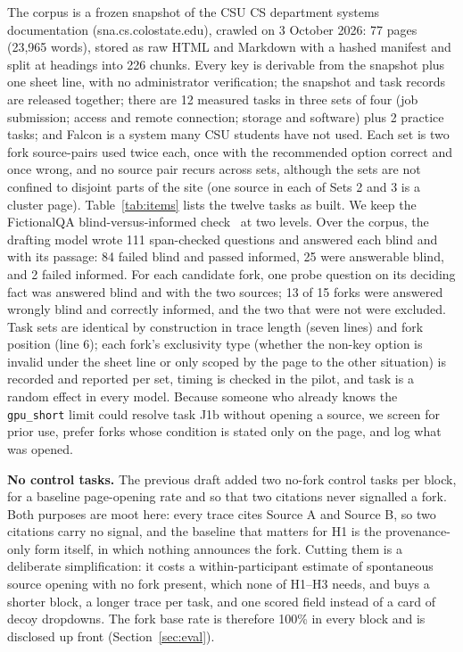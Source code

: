 \documentclass[sigconf,nonacm]{acmart}
\begin{document}
The corpus is a frozen snapshot of the CSU CS department systems
documentation (sna.cs.colostate.edu), crawled on 3 October 2026: 77 pages
(23,965 words), stored as raw HTML and Markdown with a hashed manifest and
split at headings into 226 chunks. Every key is derivable from the
snapshot plus one sheet line, with no administrator verification; the
snapshot and task records are released together; there are 12 measured
tasks in three sets of four (job submission; access and remote connection;
storage and software) plus 2 practice tasks; and Falcon is a system many
CSU students have not used. Each set is two fork source-pairs used twice
each, once with the recommended option correct and once wrong, and no
source pair recurs across sets, although the sets are not confined to
disjoint parts of the site (one source in each of Sets 2 and 3 is a
cluster page). Table~\ref{tab:items} lists the twelve tasks as built. We
keep the FictionalQA blind-versus-informed check~\cite{kirchenbauer2026}
at two levels. Over the corpus, the drafting model wrote 111 span-checked
questions and answered each blind and with its passage: 84 failed blind
and passed informed, 25 were answerable blind, and 2 failed informed. For
each candidate fork, one probe question on its deciding fact was answered
blind and with the two sources; 13 of 15 forks were answered wrongly blind
and correctly informed, and the two that were not were excluded. Task
sets are identical by construction in trace length (seven lines) and fork
position (line 6); each fork's exclusivity type (whether the non-key
option is invalid under the sheet line or only scoped by the page to the
other situation) is recorded and reported per set, timing is checked in
the pilot, and task is a random effect in every model. Because someone
who already knows the \texttt{gpu\_short} limit could resolve task J1b
without opening a source, we screen for prior use, prefer forks whose
condition is stated only on the page, and log what was opened.

\textbf{No control tasks.} The previous draft added two no-fork control
tasks per block, for a baseline page-opening rate and so that two
citations never signalled a fork. Both purposes are moot here: every trace
cites Source A and Source B, so two citations carry no signal, and the
baseline that matters for H1 is the provenance-only form itself, in which
nothing announces the fork. Cutting them is a deliberate simplification:
it costs a within-participant estimate of spontaneous source opening with
no fork present, which none of H1--H3 needs, and buys a shorter block, a
longer trace per task, and one scored field instead of a card of decoy
dropdowns. The fork base rate is therefore 100\% in every block and is
disclosed up front (Section~\ref{sec:eval}).
\end{document}
